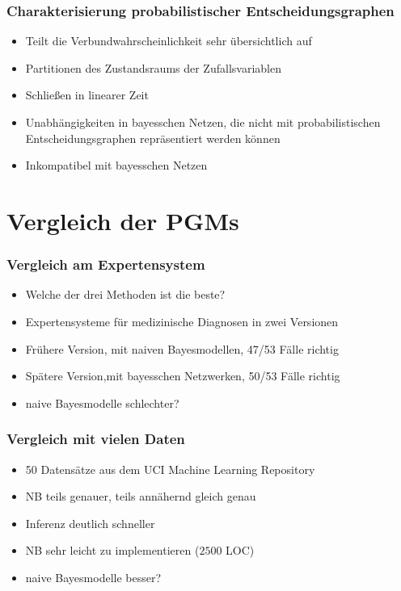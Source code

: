 \documentclass{beamer}
\begin{document}
\begin{frame}
  \frametitle{Charakterisierung probabilistischer Entscheidungsgraphen}
  \begin{itemize}
    \item Teilt die Verbundwahrscheinlichkeit sehr übersichtlich auf
    \item Partitionen des Zustandsraums der Zufallsvariablen
    \item Schließen in linearer Zeit
    \item Unabhängigkeiten in bayesschen Netzen, die nicht mit probabilistischen Entscheidungsgraphen repräsentiert werden können
    \item Inkompatibel mit bayesschen Netzen
  \end{itemize}
\end{frame}


\section{Vergleich der PGMs}
\frame{\tableofcontents[currentsection]}

\begin{frame}
  \frametitle{Vergleich am Expertensystem}
  \begin{itemize}
    \item Welche der drei Methoden ist die beste?
    \item Expertensysteme für medizinische Diagnosen in zwei Versionen
    \item Frühere Version, mit naiven Bayesmodellen, 47/53 Fälle richtig
    \item Spätere Version,mit bayesschen Netzwerken, 50/53 Fälle richtig
    \item naive Bayesmodelle schlechter?
  \end{itemize}
\end{frame}

\begin{frame}
  \frametitle{Vergleich mit vielen Daten}
  \begin{itemize}
    \item 50 Datensätze aus dem UCI Machine Learning Repository
    \item NB teils genauer, teils an­nä­hernd gleich genau
    \item Inferenz deutlich schneller
    \item NB sehr leicht zu implementieren ($2500$ LOC)
    \item naive Bayesmodelle besser?
  \end{itemize}
\end{frame}
\end{document}
